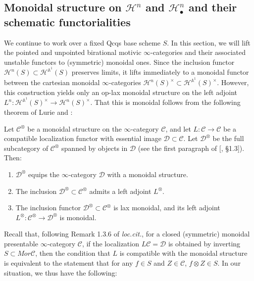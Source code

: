 \subsection{Monoidal structure on \texorpdfstring{$\mathcal{H}^n$}{hb} and \texorpdfstring{$\mathcal{H}^n_\bullet$}{hb} and their schematic functorialities}
We continue to work over a fixed Qcqs base scheme $S$. In this section, we will lift the pointed and unpointed birational motivic $\infty$-categories and their associated unstable functors to (symmetric) monoidal ones. Since the inclusion functor $\mathcal{H}^{n}(S)\subset \mathcal{H}^{\mathbb{A}^1}(S)$ preserves limits, it lifts immediately to a monoidal functor between the cartesian monoidal $\infty$-categories ${\mathcal{H}^{n}}(S)^\times\subset {\mathcal{H}^{\mathbb{A}^1}}(S)^\times$. However, this construction yields only an op-lax monoidal structure on the left adjoint $L^n:{\mathcal{H}^{\mathbb{A}^1}}(S)^\times\to {\mathcal{H}^{n}}(S)^\times$. That this is monoidal follows from the following theorem of Lurie and :
\begin{prop}\label{lurie 1.3.9}

Let $\mathcal{C}^{{{\otimes}}}$ be a monoidal structure on the $\infty$-category $\mathcal{C}$, and let $L : \mathcal{C} \to \mathcal{C}$ be a compatible localization functor with essential image $\mathcal{D} \subset \mathcal{C}$. Let $\mathcal{D}^\otimes$ be the full subcategory of $\mathcal{C}^\otimes$ spanned by objects in $\mathcal{D}$ (see the first paragraph of [\cite{lurie2007derived}, \S1.3]). Then:
\begin{enumerate}
\item $\mathcal{D}^{{\otimes}}$ equips the $\infty$-category $\mathcal{D}$ with a monoidal structure.
    \item The inclusion $\mathcal{D}^{{\otimes}} \subset \mathcal{C}^{{\otimes}}$ admits a left adjoint $L^{{\otimes}}$.
    \item The inclusion functor $\mathcal{D}^{{\otimes}} \subset \mathcal{C}^{{\otimes}}$ is lax monoidal, and its left adjoint $L^{{\otimes}} : \mathcal{C}^{{\otimes}} \to \mathcal{D}^{{\otimes}}$ is monoidal.
\end{enumerate} 
\end{prop} 
Recall that, following Remark 1.3.6 of \textit{loc.cit.}, for a closed (symmetric) monoidal presentable $\infty$-category $\mathcal{C}$, if the localization $L\mathcal{C}=\mathcal{D}$ is obtained by inverting $S\subset Mor\mathcal{C}$, then the condition that $L$ is compatible with the monoidal structure is equivalent to the statement that for any $f\in S$ and $Z\in \mathcal{C}$, $f\otimes Z\in S$. In our situation, we thus have the following:


